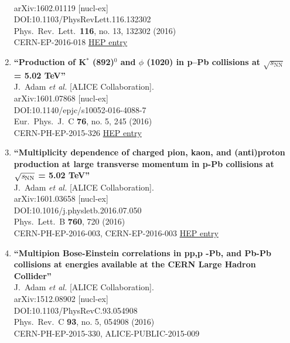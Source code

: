 \begin{enumerate}
  \\{}arXiv:1602.01119 [nucl-ex]
  \\{}DOI:10.1103/PhysRevLett.116.132302
  \\{}Phys.\ Rev.\ Lett.\  {\bf 116}, no. 13, 132302 (2016)
  \\{}CERN-EP-2016-018
\href{http://inspirehep.net/record/1419244}{HEP entry}
\item%
{\bf ``Production of K$^{*}$ (892)$^{0}$ and $\phi $ (1020) in p–Pb collisions at $\sqrt{s_{{\text {NN}}}}$ = 5.02 TeV''}
  \\{}J.~Adam {\it et al.} [ALICE Collaboration].
  \\{}arXiv:1601.07868 [nucl-ex]
  \\{}DOI:10.1140/epjc/s10052-016-4088-7
  \\{}Eur.\ Phys.\ J.\ C {\bf 76}, no. 5, 245 (2016)
  \\{}CERN-PH-EP-2015-326
\href{http://inspirehep.net/record/1418181}{HEP entry}
\item%
{\bf ``Multiplicity dependence of charged pion, kaon, and (anti)proton production at large transverse momentum in p-Pb collisions at $\mathbf{\sqrt{{\textit s}_{\rm NN}}}$ = 5.02 TeV''}
  \\{}J.~Adam {\it et al.} [ALICE Collaboration].
  \\{}arXiv:1601.03658 [nucl-ex]
  \\{}DOI:10.1016/j.physletb.2016.07.050
  \\{}Phys.\ Lett.\ B {\bf 760}, 720 (2016)
  \\{}CERN-PH-EP-2016-003, CERN-EP-2016-003
\href{http://inspirehep.net/record/1415274}{HEP entry}
\item%
{\bf ``Multipion Bose-Einstein correlations in pp,p -Pb, and Pb-Pb collisions at energies available at the CERN Large Hadron Collider''}
  \\{}J.~Adam {\it et al.} [ALICE Collaboration].
  \\{}arXiv:1512.08902 [nucl-ex]
  \\{}DOI:10.1103/PhysRevC.93.054908
  \\{}Phys.\ Rev.\ C {\bf 93}, no. 5, 054908 (2016)
  \\{}CERN-PH-EP-2015-330, ALICE-PUBLIC-2015-009

\end{enumerate}
